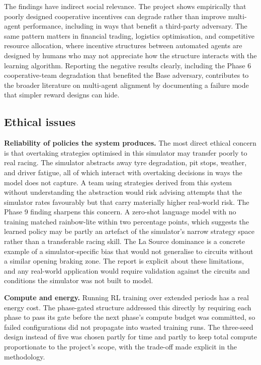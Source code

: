 \begin{appendices}
The findings have indirect social relevance. The project shows empirically that poorly designed cooperative incentives can degrade rather than improve multi-agent performance, including in ways that benefit a third-party adversary. The same pattern matters in financial trading, logistics optimisation, and competitive resource allocation, where incentive structures between automated agents are designed by humans who may not appreciate how the structure interacts with the learning algorithm. Reporting the negative results clearly, including the Phase 6 cooperative-team degradation that benefited the Base adversary, contributes to the broader literature on multi-agent alignment by documenting a failure mode that simpler reward designs can hide.

\subsection{Ethical issues}

\textbf{Reliability of policies the system produces.} The most direct ethical concern is that overtaking strategies optimised in this simulator may transfer poorly to real racing. The simulator abstracts away tyre degradation, pit stops, weather, and driver fatigue, all of which interact with overtaking decisions in ways the model does not capture. A team using strategies derived from this system without understanding the abstraction would risk advising attempts that the simulator rates favourably but that carry materially higher real-world risk. The Phase 9 finding sharpens this concern. A zero-shot language model with no training matched rainbow-lite within two percentage points, which suggests the learned policy may be partly an artefact of the simulator's narrow strategy space rather than a transferable racing skill. The La Source dominance is a concrete example of a simulator-specific bias that would not generalise to circuits without a similar opening braking zone. The report is explicit about these limitations, and any real-world application would require validation against the circuits and conditions the simulator was not built to model.

\textbf{Compute and energy.} Running RL training over extended periods has a real energy cost. The phase-gated structure addressed this directly by requiring each phase to pass its gate before the next phase's compute budget was committed, so failed configurations did not propagate into wasted training runs. The three-seed design instead of five was chosen partly for time and partly to keep total compute proportionate to the project's scope, with the trade-off made explicit in the methodology.


\end{appendices}
